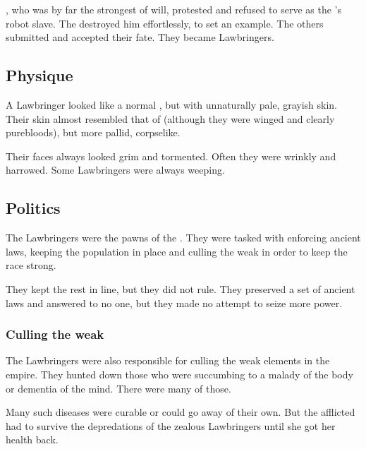 \Dolsharra, who was by far the strongest of will, protested and refused to serve as the \banelord's robot slave. 
The \banelord destroyed him effortlessly, to set an example. 
The others submitted and accepted their fate.
They became Lawbringers. 









\subsection{Physique}
A Lawbringer looked like a normal \resphan, but with unnaturally pale, grayish skin.
Their skin almost resembled that of \bezedeth (although they were winged and clearly purebloods), but more pallid, corpselike. 

Their faces always looked grim and tormented. 
Often they were wrinkly and harrowed. 
Some Lawbringers were always weeping. 









\subsection{Politics}
The Lawbringers were the pawns of the \banelords.
They were tasked with enforcing ancient laws, keeping the \resphan population in place and culling the weak \resphain in order to keep the race strong. 

They kept the rest in line, but they did not rule. 
They preserved a set of ancient laws and answered to no one, but they made no attempt to seize more power. 





\subsubsection{Culling the weak}
The Lawbringers were also responsible for culling the weak elements in the \resphan empire. 
They hunted down those \resphain who were succumbing to a malady of the body or dementia of the mind. 
There were many of those. 

Many such diseases were curable or could go away of their own. 
But the afflicted had to survive the depredations of the zealous Lawbringers until she got her health back.

